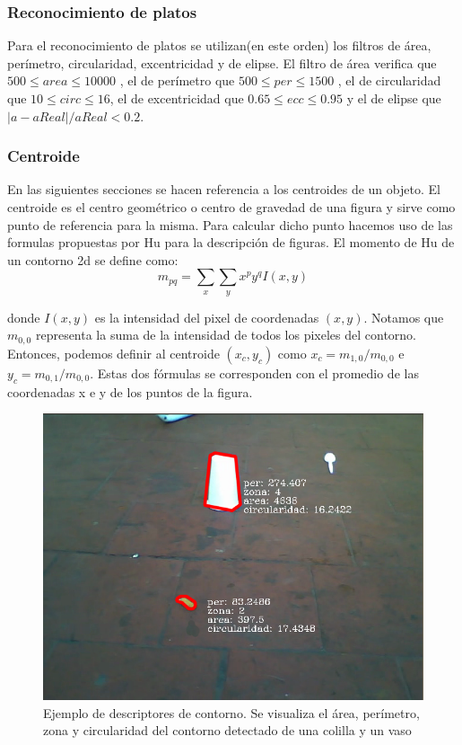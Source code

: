 	\subsubsection{Reconocimiento de platos}
	Para el reconocimiento de platos se utilizan(en este orden) los filtros de área, perímetro, circularidad, excentricidad y de elipse.
	El filtro de área verifica que $500 \leq area \leq 10000 $ , el de perímetro que $500 \leq per \leq 1500 $ , el de circularidad
	que $10 \leq circ \leq 16$, el de excentricidad que $0.65 \leq ecc \leq 0.95$ y el de elipse que $|a-aReal|/ aReal < 0.2$.
	
	\subsubsection{Centroide}
	En las siguientes secciones se hacen referencia a los centroides 
	de un objeto. El centroide es el centro geométrico o centro de 
	gravedad de una figura y 
	sirve como punto de referencia para la misma. Para calcular dicho 
	punto hacemos uso de las formulas propuestas por Hu \cite{Hu1962} para la 
	descripción de figuras. El momento de Hu de un contorno 2d se define como:
	\begin{equation}
		m_{pq}=\sum_{x}{\sum_{y}{x^py^qI(x,y)}}
	\end{equation}
	
	donde $I(x,y)$ es la intensidad del pixel de coordenadas $(x,y)$.
	Notamos que $m_{0,0}$ representa la suma de la intensidad de todos los pixeles del 
	contorno. Entonces, podemos definir al centroide $(x_c,y_c)$ como 
	$x_c= m_{1,0} / m_{0,0}$ e 
	$y_c=m_{0,1} / m_{0,0}$. Estas dos fórmulas se corresponden con el 
	promedio de las coordenadas x e y de los puntos de la figura.  


\begin{figure}[tpb]
\begin{center}
  \includegraphics[scale=0.4]{figuras/filtros.png}
\end{center}
  \caption{\small Ejemplo de descriptores de contorno. Se visualiza el área, perímetro, zona y circularidad del contorno 
  detectado de una colilla y un vaso}
  \label{fig:desc}
\end{figure}

